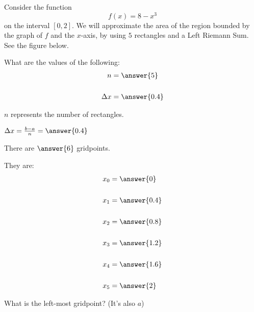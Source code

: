 \documentclass{ximera}
\author{Bobby Ramsey}
\begin{document}
\begin{exercise}

Consider the function
\[
f(x) = 8-x^3
\]
on the interval $[0,2]$.  We will approximate the area of the region bounded by the graph of $f$ and the $x$-axis, by using $5$ rectangles and a Left Riemann Sum.  See the figure below.

\begin{image}
\end{image}

What are the values of the following:
\begin{align*}
	n &= \answer{5} \\ \\
	\Delta x &= \answer{0.4}
\end{align*}
	\begin{hint}
		$n$ represents the number of rectangles.
	\end{hint}
	\begin{hint}
		$\Delta x = \frac{b-a}{n} = \answer{0.4}$
	\end{hint}

	\begin{exercise}
		There are $\answer{6}$ gridpoints.		

		\begin{exercise}
			They are:
			\begin{align*}
				x_0 &= \answer{0} \\ \\
				x_1 &= \answer{0.4} \\ \\
				x_2 &= \answer{0.8} \\ \\
				x_3 &= \answer{1.2} \\ \\
				x_4 &= \answer{1.6} \\ \\
				x_5 &= \answer{2}
			\end{align*}
			\begin{hint}
				What is the left-most gridpoint?  (It's also $a$)
				

\end{hint}
\end{exercise}
\end{exercise}
\end{exercise}
\end{document}
